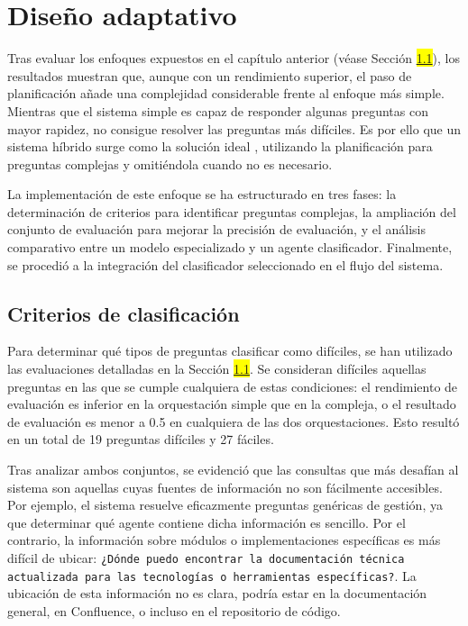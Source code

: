\section{Diseño adaptativo}
\label{sec:adaptativo}
Tras evaluar los enfoques expuestos en el capítulo anterior (véase Sección \colorbox{yellow}{\ref{}}), los resultados muestran que, aunque con un rendimiento superior, el paso de planificación añade una complejidad considerable frente al enfoque más simple. Mientras que el sistema simple es capaz de responder algunas preguntas con mayor rapidez, no consigue resolver las preguntas más difíciles. Es por ello que un sistema híbrido surge como la solución ideal \cite{jeong_adaptive-rag_2024}, utilizando la planificación para preguntas complejas y omitiéndola cuando no es necesario.

La implementación de este enfoque se ha estructurado en tres fases: la determinación de criterios para identificar preguntas complejas, la ampliación del conjunto de evaluación para mejorar la precisión de evaluación, y el análisis comparativo entre un modelo especializado y un agente clasificador. Finalmente, se procedió a la integración del clasificador seleccionado en el flujo del sistema.

\subsection{Criterios de clasificación}

Para determinar qué tipos de preguntas clasificar como difíciles, se han utilizado las evaluaciones detalladas en la Sección \colorbox{yellow}{\ref{}}. Se consideran difíciles aquellas preguntas en las que se cumple cualquiera de estas condiciones: el rendimiento de evaluación es inferior en la orquestación simple que en la compleja, o el resultado de evaluación es menor a 0.5 en cualquiera de las dos orquestaciones. Esto resultó en un total de 19 preguntas difíciles y 27 fáciles.

Tras analizar ambos conjuntos, se evidenció que las consultas que más desafían al sistema son aquellas cuyas fuentes de información no son fácilmente accesibles. Por ejemplo, el sistema resuelve eficazmente preguntas genéricas de gestión, ya que determinar qué agente contiene dicha información es sencillo. Por el contrario, la información sobre módulos o implementaciones específicas es más difícil de ubicar: \texttt{¿Dónde puedo encontrar la documentación técnica actualizada para las tecnologías o herramientas específicas?}. La ubicación de esta información no es clara, podría estar en la documentación general, en Confluence, o incluso en el repositorio de código.

